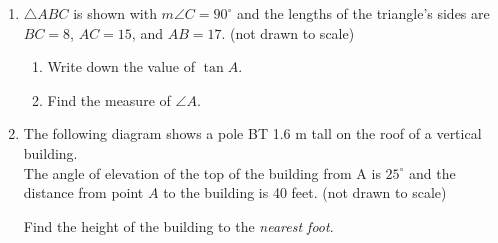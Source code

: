 \documentclass[12pt, twoside]{article}
\begin{document}
\begin{enumerate}
\item $\triangle ABC$ is shown with $m\angle C=90^\circ$ and the lengths of the triangle's sides are $BC=8$, $AC=15$, and $AB=17$. (not drawn to scale)
  \begin{multicols}{2}
        \begin{enumerate}
        \item Write down the value of $\tan A$. \vspace{0.5cm}
        \item Find the measure of $\angle A$.  \vspace{1cm}
      \end{enumerate}
    \end{multicols} \vspace{2cm}

\item The following diagram shows a pole BT 1.6 m tall on the roof of a vertical building. \\[0.25cm]
  The angle of elevation of the top of the building from A is  
  $25^\circ$ and the distance from point $A$ to the building is 40 feet. (not drawn to scale)
    \begin{center}
      \end{center}
      Find the height of the building to the \emph{nearest foot}.

\end{enumerate}
\end{document}
